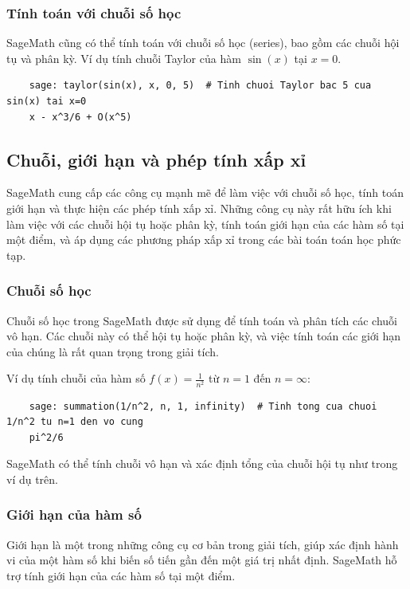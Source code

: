 \subsubsection{Tính toán với chuỗi số học}

SageMath cũng có thể tính toán với chuỗi số học (series), bao gồm các chuỗi hội tụ và phân kỳ. Ví dụ tính chuỗi Taylor của hàm \(\sin(x)\) tại \(x = 0\).

\begin{lstlisting}
	sage: taylor(sin(x), x, 0, 5)  # Tinh chuoi Taylor bac 5 cua sin(x) tai x=0
	x - x^3/6 + O(x^5)
\end{lstlisting}

\subsection{Chuỗi, giới hạn và phép tính xấp xỉ}

SageMath cung cấp các công cụ mạnh mẽ để làm việc với chuỗi số học, tính toán giới hạn và thực hiện các phép tính xấp xỉ. Những công cụ này rất hữu ích khi làm việc với các chuỗi hội tụ hoặc phân kỳ, tính toán giới hạn của các hàm số tại một điểm, và áp dụng các phương pháp xấp xỉ trong các bài toán toán học phức tạp.

\subsubsection{Chuỗi số học}

Chuỗi số học trong SageMath được sử dụng để tính toán và phân tích các chuỗi vô hạn. Các chuỗi này có thể hội tụ hoặc phân kỳ, và việc tính toán các giới hạn của chúng là rất quan trọng trong giải tích.

Ví dụ tính chuỗi của hàm số \(f(x) = \frac{1}{n^2}\) từ \(n = 1\) đến \(n = \infty\):

\begin{lstlisting}
	sage: summation(1/n^2, n, 1, infinity)  # Tinh tong cua chuoi 1/n^2 tu n=1 den vo cung
	pi^2/6
\end{lstlisting}

SageMath có thể tính chuỗi vô hạn và xác định tổng của chuỗi hội tụ như trong ví dụ trên.

\subsubsection{Giới hạn của hàm số}

Giới hạn là một trong những công cụ cơ bản trong giải tích, giúp xác định hành vi của một hàm số khi biến số tiến gần đến một giá trị nhất định. SageMath hỗ trợ tính giới hạn của các hàm số tại một điểm.


